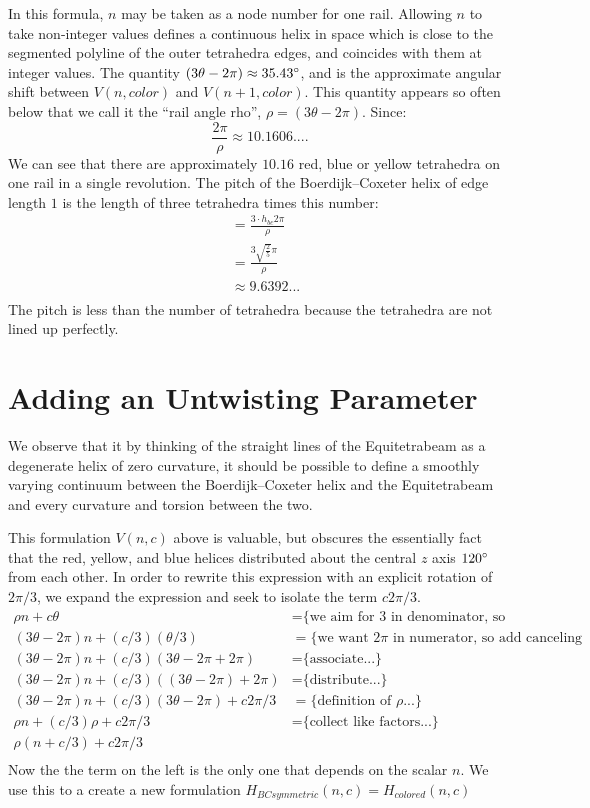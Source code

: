 \documentclass[11pt]{article}
\begin{document}
In this formula, $n$ may be taken as a node number for one rail. Allowing $n$ to take non-integer values defines a continuous
helix in space which is close to the segmented polyline of the outer tetrahedra edges, and coincides with them at integer
values.
The quantity $ (3 \theta - 2 \pi) \approx 35.43 \degree $, and is the approximate angular shift between $V(n,color)$ and
$V(n+1,color)$. This quantity appears so often below that we call it the ``rail angle rho'', $\rho = (3 \theta - 2 \pi)$.
Since:
\[ \frac{2 \pi}{\rho} \approx 10.1606....
\]
We can see that there are approximately $10.16$ red, blue or yellow tetrahedra on one rail in a single revolution.
The pitch of the Boerdijk--Coxeter helix of edge length $1$ is the length of three tetrahedra times this number:
\begin{align*}
  &= \frac{3 \cdot h_{bc} 2 \pi }{\rho} \\
  &= \frac{3  \sqrt{\frac{2}{5}}  \pi}{\rho} \\
  &\approx 9.6392... \\
\end{align*}
The pitch is less than the number of tetrahedra because the tetrahedra are not lined up perfectly.

\section{Adding an Untwisting Parameter}

We observe that it by thinking of the straight lines of the Equitetrabeam as a degenerate helix of zero curvature,
it should be possible to define a smoothly varying continuum between the Boerdijk--Coxeter helix and the Equitetrabeam and every
curvature and torsion between the two.

This formulation $V(n,c)$ above is valuable, but obscures the essentially fact that the red, yellow, and blue helices distributed
about the central $z$ axis $120\degree$ from each other.
In order to rewrite this expression with an explicit rotation of $2\pi/3$, we expand 
the expression and seek to isolate the term $c2\pi/3$.
\begin{align*}
  \rho n + c \theta  &=   \text{\{we aim for 3 in denominator, so we split...\}} \\
    (3 \theta - 2 \pi)n + (c/3)  (\theta /3)  &=   \text{\{we want $2\pi$ in numerator, so add canceling terms...\}} \\
  (3 \theta - 2 \pi)n + (c/ 3) (3 \theta - 2 \pi  + 2 \pi) &=  \text{\{associate...\}} \\
  (3 \theta - 2 \pi)n + (c/ 3) ((3 \theta - 2 \pi)  + 2 \pi) &=  \text{\{distribute...\}} \\  
  (3 \theta - 2 \pi)n + (c / 3) (3 \theta - 2 \pi)  + c 2 \pi /3 &=  \text{\{definition of $\rho$...\}} \\
  \rho n + (c / 3) \rho  + c 2 \pi /3 &=  \text{\{collect like factors...\}} \\  
  \rho (n + c/3)  + c 2 \pi /3  \\
\end{align*}
Now the the term on the left is the only one that depends on the scalar $n$. We use this to a create
a new formulation $H_{BCsymmetric}(n,c) = H_{colored}(n,c)$
\end{document}
